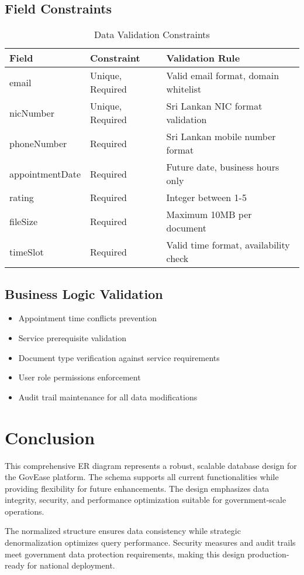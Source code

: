 \documentclass[12pt,a4paper]{article}
\begin{document}
\subsection{Field Constraints}
\begin{table}[h!]
\centering
\begin{tabularx}{\textwidth}{|X|X|X|}
\hline
\textbf{Field} & \textbf{Constraint} & \textbf{Validation Rule} \\
\hline
email & Unique, Required & Valid email format, domain whitelist \\
\hline
nicNumber & Unique, Required & Sri Lankan NIC format validation \\
\hline
phoneNumber & Required & Sri Lankan mobile number format \\
\hline
appointmentDate & Required & Future date, business hours only \\
\hline
rating & Required & Integer between 1-5 \\
\hline
fileSize & Required & Maximum 10MB per document \\
\hline
timeSlot & Required & Valid time format, availability check \\
\hline
\end{tabularx}
\caption{Data Validation Constraints}
\label{tab:validation}
\end{table}

\subsection{Business Logic Validation}
\begin{itemize}[leftmargin=*]
    \item Appointment time conflicts prevention
    \item Service prerequisite validation
    \item Document type verification against service requirements
    \item User role permissions enforcement
    \item Audit trail maintenance for all data modifications
\end{itemize}

\section{Conclusion}

This comprehensive ER diagram represents a robust, scalable database design for the GovEase platform. The schema supports all current functionalities while providing flexibility for future enhancements. The design emphasizes data integrity, security, and performance optimization suitable for government-scale operations.

The normalized structure ensures data consistency while strategic denormalization optimizes query performance. Security measures and audit trails meet government data protection requirements, making this design production-ready for national deployment.
\end{document}

